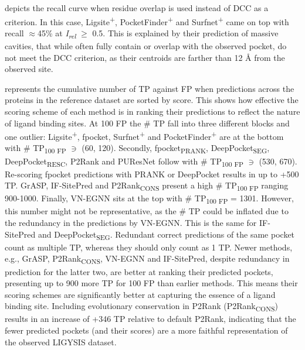  depicts the recall curve when residue overlap is used instead of DCC as a criterion. In this case, Ligsite\textsuperscript{+}, PocketFinder\textsuperscript{+} and Surfnet\textsuperscript{+} came on top with recall $\approx$45\% at \textit{I\textsubscript{rel}} $\geq$ 0.5. This is explained by their prediction of massive cavities, that while often fully contain or overlap with the observed pocket, do not meet the DCC criterion, as their centroids are farther than 12 \AA{} from the observed site.

 represents the cumulative number of TP against FP when predictions across the proteins in the reference dataset are sorted by score. This shows how effective the scoring scheme of each method is in ranking their predictions to reflect the nature of ligand binding sites. At 100 FP the \# TP fall into three different blocks and one outlier: Ligsite\textsuperscript{+}, fpocket, Surfnet\textsuperscript{+} and PocketFinder\textsuperscript{+} are at the bottom with \# TP\textsubscript{100 FP} $\ni$ (60, 120). Secondly, fpocket\textsubscript{PRANK}, DeepPocket\textsubscript{SEG}, DeepPocket\textsubscript{RESC}, P2Rank and PUResNet follow with \# TP\textsubscript{100 FP} $\ni$ (530, 670). Re-scoring fpocket predictions with PRANK or DeepPocket results in up to +500 TP. GrASP, IF-SitePred and P2Rank\textsubscript{CONS} present a high \# TP\textsubscript{100 FP} ranging 900-1000. Finally, VN-EGNN sits at the top with \# TP\textsubscript{100 FP} = 1301. However, this number might not be representative, as the \# TP could be inflated due to the redundancy in the predictions by VN-EGNN. This is the same for IF-SitePred and DeepPocket\textsubscript{SEG}. Redundant correct predictions of the same pocket count as multiple TP, whereas they should only count as 1 TP. Newer methods, e.g., GrASP, P2Rank\textsubscript{CONS}, VN-EGNN and IF-SitePred, despite redundancy in prediction for the latter two, are better at ranking their predicted pockets, presenting up to 900 more TP for 100 FP than earlier methods. This means their scoring schemes are significantly better at capturing the essence of a ligand binding site. Including evolutionary conservation in P2Rank (P2Rank\textsubscript{CONS}) results in an increase of +346 TP relative to default P2Rank, indicating that the fewer predicted pockets (and their scores) are a more faithful representation of the observed LIGYSIS dataset.

